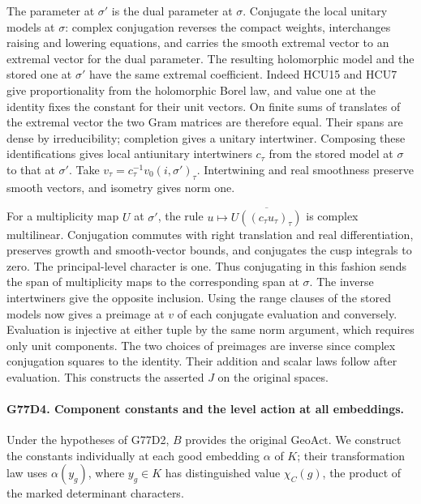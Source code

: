 The parameter at $\sigma'$ is the dual parameter at $\sigma$.
Conjugate the local unitary models at $\sigma$: complex
conjugation reverses the compact weights, interchanges raising
and lowering equations, and carries the smooth extremal vector
to an extremal vector for the dual parameter. The resulting
holomorphic model and the stored one at $\sigma'$ have the same
extremal coefficient. Indeed HCU15 and HCU7 give proportionality
from the holomorphic Borel law, and value one at the identity
fixes the constant for their unit vectors. On finite sums of
translates of the extremal vector the two Gram matrices are
therefore equal. Their spans are dense by irreducibility; completion
gives a unitary intertwiner. Composing these identifications
gives local antiunitary intertwiners $c_\tau$ from the stored
model at $\sigma$ to that at $\sigma'$. Take
$v_\tau=c_\tau^{-1}v_0(i,\sigma')_\tau$. Intertwining and
real smoothness preserve smooth vectors, and isometry gives norm one.

For a multiplicity map $U$ at $\sigma'$, the rule
$u\mapsto\overline{U((c_\tau u_\tau)_\tau)}$ is complex
multilinear. Conjugation commutes with right translation and
real differentiation, preserves growth and smooth-vector bounds,
and conjugates the cusp integrals to zero. The principal-level
character is one. Thus conjugating in this fashion sends the
span of multiplicity maps to the corresponding span at $\sigma$.
The inverse intertwiners give the opposite inclusion.
Using the range clauses of the stored models now gives a preimage
at $v$ of each conjugate evaluation and conversely. Evaluation is
injective at either tuple by the same norm argument, which requires
only unit components. The two choices of preimages are inverse
since complex conjugation squares to the identity. Their addition
and scalar laws follow after evaluation. This constructs the
asserted $J$ on the original spaces.

\paragraph{G77D4. Component constants and the level action at all embeddings.}
Under the hypotheses of G77D2, $B$ provides the original
$\mathrm{GeoAct}$. We construct the constants individually at
each good embedding $\alpha$ of $K$; their transformation law
uses $\alpha(y_g)$, where $y_g\in K$ has distinguished value
$\chi_C(g)$, the product of the marked determinant characters.

